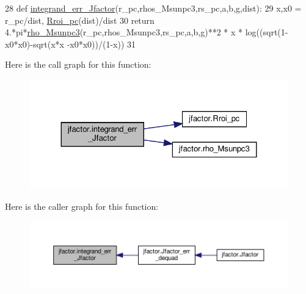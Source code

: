 \begin{DoxyCode}
28 \textcolor{keyword}{def }\hyperlink{namespacejfactor_afb33d5b3499565b8b7c23e15f3615ec0}{integrand\_err\_Jfactor}(r\_pc,rhos\_Msunpc3,rs\_pc,a,b,g,dist):
29     x,x0 = r\_pc/dist, \hyperlink{namespacejfactor_ae5aad7f2ac90b82740c027677d7f4ac7}{Rroi\_pc}(dist)/dist
30     \textcolor{keywordflow}{return} 4.*pi*\hyperlink{namespacejfactor_aa60ca47daf4f993e2cc8bd268f7b206d}{rho\_Msunpc3}(r\_pc,rhos\_Msunpc3,rs\_pc,a,b,g)**2 * x * log((sqrt(1-x0*x0)-sqrt(x*x
      -x0*x0))/(1-x))
31 
\end{DoxyCode}
Here is the call graph for this function\+:\nopagebreak
\begin{figure}[H]
\begin{center}
\leavevmode
\includegraphics[width=324pt]{de/d47/namespacejfactor_afb33d5b3499565b8b7c23e15f3615ec0_cgraph}
\end{center}
\end{figure}
Here is the caller graph for this function\+:\nopagebreak
\begin{figure}[H]
\begin{center}
\leavevmode
\includegraphics[width=350pt]{de/d47/namespacejfactor_afb33d5b3499565b8b7c23e15f3615ec0_icgraph}
\end{center}
\end{figure}
\mbox{\label{namespacejfactor_a3261c30e40781120e1cacf7721893cb7}} 
